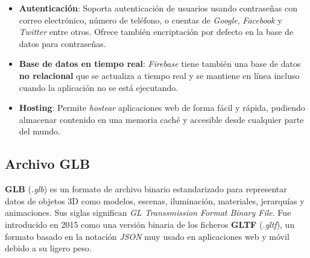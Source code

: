 \begin{itemize}
    \item \textbf{Autenticación}: Soporta autenticación de usuarios usando contraseñas con correo electrónico, número de teléfono, o cuentas de \textit{Google}, \textit{Facebook} y \textit{Twitter} entre otros. Ofrece también encriptación por defecto en la base de datos para contraseñas.
    \item \textbf{Base de datos en tiempo real}: \textit{Firebase} tiene también una base de datos \textbf{no relacional} que se actualiza a tiempo real y se mantiene en línea incluso cuando la aplicación no se está ejecutando.
    \item \textbf{Hosting}: Permite \textit{hostear} aplicaciones web de forma fácil y rápida, pudiendo almacenar contenido en una memoria caché y accesible desde cualquier parte del mundo.
\end{itemize}

\subsection{Archivo GLB}
\textbf{GLB} (\textit{.glb}) es un formato de archivo binario estandarizado para representar datos de objetos 3D como modelos, escenas, iluminación, materiales, jerarquías y animaciones. Sus siglas significan \textit{GL Transsmission Format Binary File}. Fue introducido en 2015 como una versión binaria de los ficheros \textbf{GLTF} (\textit{.gltf}), un formato basado en la notación \textit{JSON} muy usado en aplicaciones web y móvil debido a su ligero peso.